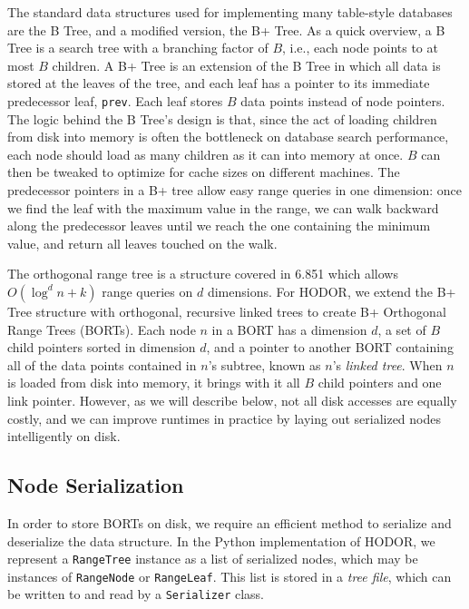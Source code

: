 \documentclass[11pt, oneside]{article}
\newcommand{\ms}{\texttt}
\begin{document}
The standard data structures used for implementing many table-style databases
are the B Tree, and a modified version, the B+ Tree. As a quick overview, a B
Tree is a search tree with a branching factor of $B$, i.e., each node points to
at most $B$ children. A B+ Tree is an extension of the B Tree in which all data
is stored at the leaves of the tree, and each leaf has a pointer to its
immediate predecessor leaf, \ms{prev}. Each leaf stores $B$ data points instead
of node pointers. The logic behind the B Tree's design is that, since the act of
loading children from disk into memory is often the bottleneck on database
search performance, each node should load as many children as it can into memory
at once. $B$ can then be tweaked to optimize for cache sizes on different
machines.  The predecessor pointers in a B+ tree allow easy range queries in one
dimension: once we find the leaf with the maximum value in the range, we can
walk backward along the predecessor leaves until we reach the one containing the
minimum value, and return all leaves touched on the walk.

The orthogonal range tree is a structure covered in 6.851 which allows
$O(\log^d n + k)$ range queries on $d$ dimensions. For HODOR, we extend the B+
Tree structure with orthogonal, recursive linked trees to create B+ Orthogonal
Range Trees (BORTs). Each node $n$ in a BORT has a dimension $d$, a set of $B$
child pointers sorted in dimension $d$, and a pointer to another BORT containing
all of the data points contained in $n$'s subtree, known as $n$'s \textit{linked
tree}. When $n$ is loaded from disk into memory, it brings with it all $B$ child
pointers and one link pointer. However, as we will describe below, not all disk
accesses are equally costly, and we can improve runtimes in practice by laying
out serialized nodes intelligently on disk.

\subsection{Node Serialization}

In order to store BORTs on disk, we require an efficient method to serialize and
deserialize the data structure. In the Python implementation of HODOR, we
represent a \ms{RangeTree} instance as a list of serialized nodes, which may be
instances of \ms{RangeNode} or \ms{RangeLeaf}. This list is stored in a
\textit{tree file}, which can be written to and read by a \ms{Serializer} class. 
\end{document}
